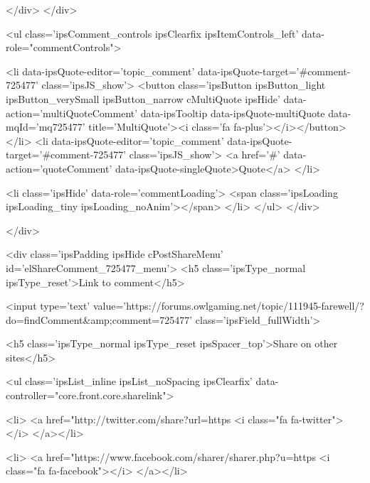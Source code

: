 			
			
		</div>
	</div>

					
				
				<ul class='ipsComment_controls ipsClearfix ipsItemControls_left' data-role="commentControls">
					
						
							<li data-ipsQuote-editor='topic_comment' data-ipsQuote-target='#comment-725477' class='ipsJS_show'>
								<button class='ipsButton ipsButton_light ipsButton_verySmall ipsButton_narrow cMultiQuote ipsHide' data-action='multiQuoteComment' data-ipsTooltip data-ipsQuote-multiQuote data-mqId='mq725477' title='MultiQuote'><i class='fa fa-plus'></i></button>
							</li>
							<li data-ipsQuote-editor='topic_comment' data-ipsQuote-target='#comment-725477' class='ipsJS_show'>
								<a href='#' data-action='quoteComment' data-ipsQuote-singleQuote>Quote</a>
							</li>
						
						
						
					
					<li class='ipsHide' data-role='commentLoading'>
						<span class='ipsLoading ipsLoading_tiny ipsLoading_noAnim'></span>
					</li>
				</ul>
			</div>
		

		
	</div>

	

	



<div class='ipsPadding ipsHide cPostShareMenu' id='elShareComment_725477_menu'>
	<h5 class='ipsType_normal ipsType_reset'>Link to comment</h5>
	
		
	
	
	<input type='text' value='https://forums.owlgaming.net/topic/111945-farewell/?do=findComment&amp;comment=725477' class='ipsField_fullWidth'>

	
	<h5 class='ipsType_normal ipsType_reset ipsSpacer_top'>Share on other sites</h5>
	

	<ul class='ipsList_inline ipsList_noSpacing ipsClearfix' data-controller="core.front.core.sharelink">
		
			<li>
<a href="http://twitter.com/share?url=https%
	<i class="fa fa-twitter"></i>
</a></li>
		
			<li>
<a href="https://www.facebook.com/sharer/sharer.php?u=https%
	<i class="fa fa-facebook"></i>
</a></li>
		
